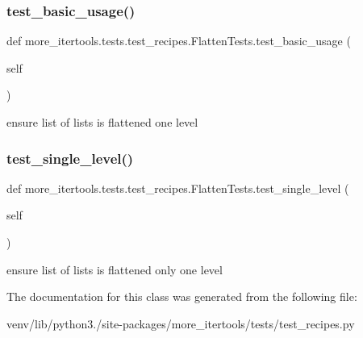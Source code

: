 \subsubsection{\texorpdfstring{test\+\_\+basic\+\_\+usage()}{test\_basic\_usage()}}
{\footnotesize\ttfamily def more\+\_\+itertools.\+tests.\+test\+\_\+recipes.\+Flatten\+Tests.\+test\+\_\+basic\+\_\+usage (\begin{DoxyParamCaption}\item[{}]{self }\end{DoxyParamCaption})}

\begin{DoxyVerb}ensure list of lists is flattened one level\end{DoxyVerb}
 \mbox{\label{classmore__itertools_1_1tests_1_1test__recipes_1_1_flatten_tests_af3f32ac0369a3e52808b63b25d1bf8bd}} 
\subsubsection{\texorpdfstring{test\+\_\+single\+\_\+level()}{test\_single\_level()}}
{\footnotesize\ttfamily def more\+\_\+itertools.\+tests.\+test\+\_\+recipes.\+Flatten\+Tests.\+test\+\_\+single\+\_\+level (\begin{DoxyParamCaption}\item[{}]{self }\end{DoxyParamCaption})}

\begin{DoxyVerb}ensure list of lists is flattened only one level\end{DoxyVerb}
 

The documentation for this class was generated from the following file\+:\begin{DoxyCompactItemize}
\item 
venv/lib/python3./site-\/packages/more\+\_\+itertools/tests/test\+\_\+recipes.\+py\end{DoxyCompactItemize}
